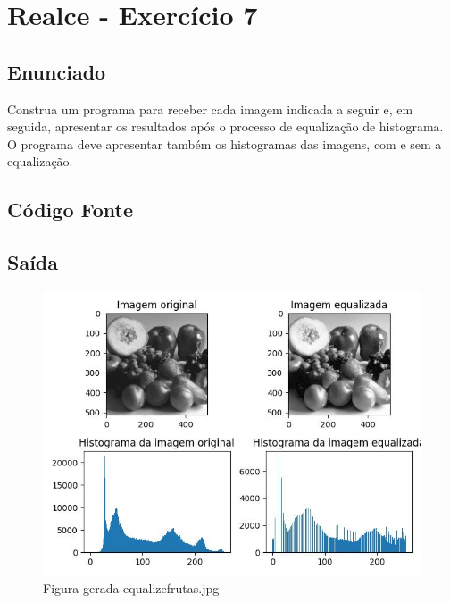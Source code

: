 \documentclass[10pt,a4paper]{article}
\begin{document}
\pagebreak

\section{Realce - Exercício 7}

\subsection{Enunciado}

\begin{flushleft}
Construa um programa para receber cada imagem indicada a seguir e, em seguida, apresentar os resultados após o processo de equalização de histograma. O programa deve apresentar também os histogramas das imagens, com e sem a equalização.
\end{flushleft}

\subsection{Código Fonte}



\subsection{Saída}

\begin{figure}[H]
    \centering
    \includegraphics[scale=0.7]{images_generate/05/equalize_frutas.jpg}
    \caption{Figura gerada equalize\textunderscore frutas.jpg}
\end{figure}
\end{document}

